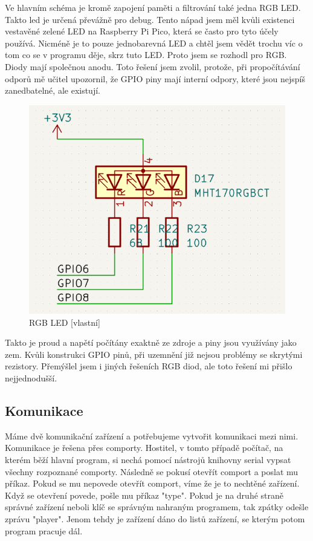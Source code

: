 \documentclass[12pt,a4paper]{article}
\begin{document}
Ve hlavním schéma je kromě zapojení paměti a filtrování také jedna RGB LED. Takto led je určená převážně pro debug. Tento nápad jsem měl kvůli existenci vestavěné zelené LED na Raspberry Pi Pico, která se často pro tyto účely používá. Nicméně je to pouze jednobarevná LED a chtěl jsem vědět trochu víc o tom co se v programu děje, skrz tuto LED. Proto jsem se rozhodl pro RGB. Diody mají společnou anodu. Toto řešení jsem zvolil, protože, při propočítávání odporů mě učitel upozornil, že GPIO piny  mají interní odpory, které jsou nejspíš zanedbatelné, ale existují.

\begin{figure}[H]
    \centering
    \includegraphics[width=\textwidth-3 cm]{pictures/RGB LED.png}
    \caption{RGB LED [vlastní]}
\end{figure}

Takto je proud a napětí počítány exaktně ze zdroje a piny jsou využívány jako zem. Kvůli konstrukci GPIO pinů, při uzemnění již nejsou problémy se skrytými rezistory. Přemýšlel jsem i jiných řešeních RGB diod, ale toto řešení mi přišlo nejjednodušší. 

\subsection{Komunikace}
Máme dvě komunikační zařízení a potřebujeme vytvořit komunikaci mezi nimi. Komunikace je řešena přes comporty. Hostitel, v tomto případě počítač, na kterém běží hlavní program, si nechá pomocí nástrojů knihovny serial vypsat všechny rozpoznané comporty. Následně se pokusí otevřít comport a poslat mu příkaz. Pokud se mu nepovede otevřít comport, víme že je to nechtěné zařízení. Když se otevření povede, pošle mu příkaz "type". Pokud je na druhé straně správné zařízení neboli klíč se správným nahraným programem, tak zpátky odešle zprávu "player". Jenom tehdy je zařízení dáno do listů zařízení, se kterým potom program pracuje dál.
\end{document}
